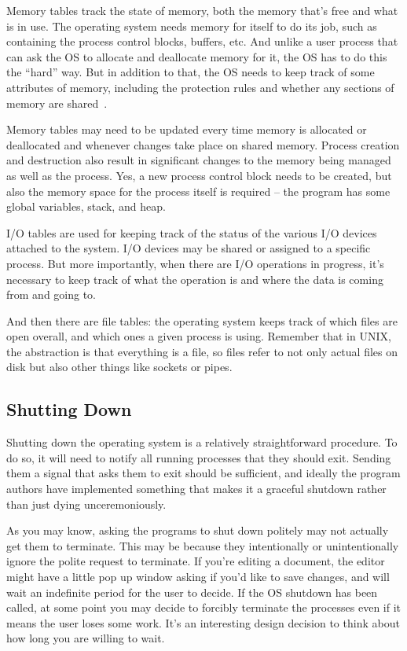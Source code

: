 Memory tables track the state of memory, both the memory that's free and what is in use. The operating system needs memory for itself to do its job, such as containing the process control blocks, buffers, etc. And unlike a user process that can ask the OS to allocate and deallocate memory for it, the OS has to do this the ``hard'' way. But in addition to that, the OS needs to keep track of some attributes of memory, including the protection rules and whether any sections of memory are shared~\cite{osi}. 

Memory tables may need to be updated every time memory is allocated or deallocated and whenever changes take place on shared memory. Process creation and destruction also result in significant changes to the memory being managed as well as the process. Yes, a new process control block needs to be created, but also the memory space for the process itself is required -- the program has some global variables, stack, and heap.

I/O tables are used for keeping track of the status of the various I/O devices attached to the system. I/O devices may be shared or assigned to a specific process. But more importantly, when there are I/O operations in progress, it's necessary to keep track of what the operation is and where the data is coming from and going to. 

And then there are file tables: the operating system keeps track of which files are open overall, and which ones a given process is using. Remember that in UNIX, the abstraction is that everything is a file, so files refer to not only actual files on disk but also other things like sockets or pipes.


\subsection*{Shutting Down}
Shutting down the operating system is a relatively straightforward procedure. To do so, it will need to notify all running processes that they should exit. Sending them a signal that asks them to exit should be sufficient, and ideally the program authors have implemented something that makes it a graceful shutdown rather than just dying unceremoniously. 

As you may know, asking the programs to shut down politely may not actually get them to terminate. This may be because they intentionally or unintentionally ignore the polite request to terminate. If you're editing a document, the editor might have a little pop up window asking if you'd like to save changes, and will wait an indefinite period for the user to decide. If the OS shutdown has been called, at some point you may decide to forcibly terminate the processes even if it means the user loses some work. It's an interesting design decision to think about how long you are willing to wait. 

